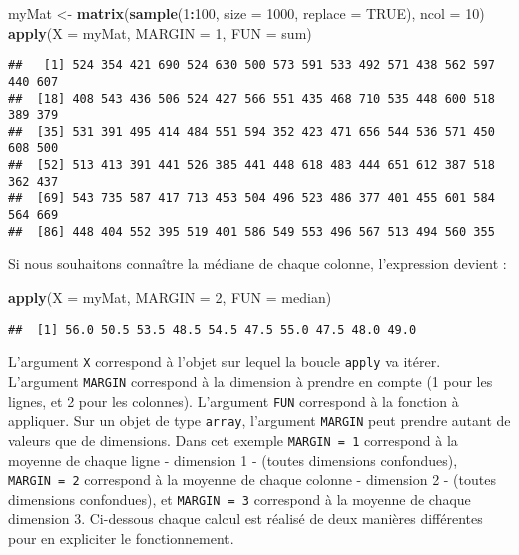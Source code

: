 \documentclass[]{book}
\newenvironment{Shaded}{\begin{snugshade}}{\end{snugshade}}
\newcommand{\KeywordTok}[1]{\textcolor[rgb]{0.13,0.29,0.53}{\textbf{#1}}}
\newcommand{\DataTypeTok}[1]{\textcolor[rgb]{0.13,0.29,0.53}{#1}}
\newcommand{\DecValTok}[1]{\textcolor[rgb]{0.00,0.00,0.81}{#1}}
\newcommand{\StringTok}[1]{\textcolor[rgb]{0.31,0.60,0.02}{#1}}
\newcommand{\OtherTok}[1]{\textcolor[rgb]{0.56,0.35,0.01}{#1}}
\newcommand{\OperatorTok}[1]{\textcolor[rgb]{0.81,0.36,0.00}{\textbf{#1}}}
\newcommand{\NormalTok}[1]{#1}
\theoremstyle{definition}
\theoremstyle{definition}
\theoremstyle{definition}
\theoremstyle{remark}
\begin{document}
\begin{Shaded}
\begin{Highlighting}[]
\NormalTok{myMat <-}\StringTok{ }\KeywordTok{matrix}\NormalTok{(}\KeywordTok{sample}\NormalTok{(}\DecValTok{1}\OperatorTok{:}\DecValTok{100}\NormalTok{, }\DataTypeTok{size =} \DecValTok{1000}\NormalTok{, }\DataTypeTok{replace =} \OtherTok{TRUE}\NormalTok{), }\DataTypeTok{ncol =} \DecValTok{10}\NormalTok{)}
\KeywordTok{apply}\NormalTok{(}\DataTypeTok{X =}\NormalTok{ myMat, }\DataTypeTok{MARGIN =} \DecValTok{1}\NormalTok{, }\DataTypeTok{FUN =}\NormalTok{ sum)}
\end{Highlighting}
\end{Shaded}

\begin{verbatim}
##   [1] 524 354 421 690 524 630 500 573 591 533 492 571 438 562 597 440 607
##  [18] 408 543 436 506 524 427 566 551 435 468 710 535 448 600 518 389 379
##  [35] 531 391 495 414 484 551 594 352 423 471 656 544 536 571 450 608 500
##  [52] 513 413 391 441 526 385 441 448 618 483 444 651 612 387 518 362 437
##  [69] 543 735 587 417 713 453 504 496 523 486 377 401 455 601 584 564 669
##  [86] 448 404 552 395 519 401 586 549 553 496 567 513 494 560 355
\end{verbatim}

Si nous souhaitons connaître la médiane de chaque colonne, l'expression
devient :

\begin{Shaded}
\begin{Highlighting}[]
\KeywordTok{apply}\NormalTok{(}\DataTypeTok{X =}\NormalTok{ myMat, }\DataTypeTok{MARGIN =} \DecValTok{2}\NormalTok{, }\DataTypeTok{FUN =}\NormalTok{ median)}
\end{Highlighting}
\end{Shaded}

\begin{verbatim}
##  [1] 56.0 50.5 53.5 48.5 54.5 47.5 55.0 47.5 48.0 49.0
\end{verbatim}

L'argument \texttt{X} correspond à l'objet sur lequel la boucle
\texttt{apply} va itérer. L'argument \texttt{MARGIN} correspond à la
dimension à prendre en compte (1 pour les lignes, et 2 pour les
colonnes). L'argument \texttt{FUN} correspond à la fonction à appliquer.
Sur un objet de type \texttt{array}, l'argument \texttt{MARGIN} peut
prendre autant de valeurs que de dimensions. Dans cet exemple
\texttt{MARGIN\ =\ 1} correspond à la moyenne de chaque ligne -
dimension 1 - (toutes dimensions confondues), \texttt{MARGIN\ =\ 2}
correspond à la moyenne de chaque colonne - dimension 2 - (toutes
dimensions confondues), et \texttt{MARGIN\ =\ 3} correspond à la moyenne
de chaque dimension 3. Ci-dessous chaque calcul est réalisé de deux
manières différentes pour en expliciter le fonctionnement.
\end{document}
